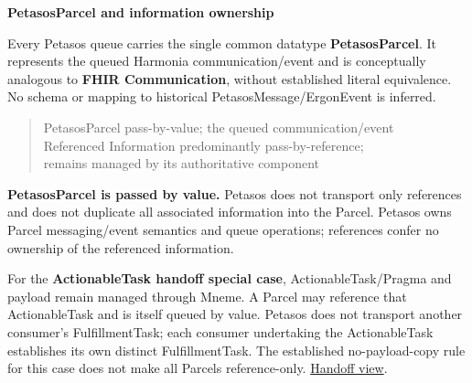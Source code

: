 \par\medskip\textbf{PetasosParcel and information ownership}\par


Every Petasos queue carries the single common datatype \textbf{PetasosParcel}.
It represents the queued Harmonia communication/event and is conceptually
analogous to \textbf{FHIR Communication}, without established literal equivalence.
No schema or mapping to historical PetasosMessage/ErgonEvent is inferred.



\begin{quote}\small\ttfamily
PetasosParcel          pass-by-value; the queued communication/event\\
Referenced Information predominantly pass-by-reference;\\
                       remains managed by its authoritative component\\

\end{quote}


\textbf{PetasosParcel is passed by value.} Petasos does not transport only references
and does not duplicate all associated information into the Parcel. Petasos owns
Parcel messaging/event semantics and queue operations; references confer no
ownership of the referenced information.



For the \textbf{ActionableTask handoff special case}, ActionableTask/Pragma and payload
remain managed through Mneme. A Parcel may reference that ActionableTask and is
itself queued by value. Petasos does not transport another consumer's
FulfillmentTask; each consumer undertaking the ActionableTask establishes its own
distinct FulfillmentTask. The established no-payload-copy rule for this case
does not make all Parcels reference-only. \href{\detokenize{../../../../../docs/markdown/05-information-systems-architecture/pathways-journeys-and-handoff.md#persistent-handoff}}{Handoff view}.



